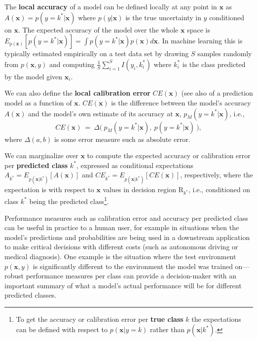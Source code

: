 \documentclass{article}
\newcommand{\ux}{{\mathbf{x}}}
\newcommand{\robby}[1]{\textcolor{Red}{[#1]\textsubscript{Robby}}}
\begin{document}
The {\bf local accuracy} of a model can be defined locally at any point in $\ux$ as $A(\ux) = p(y = k^*| \ux)$ where $p(y | \ux)$ is the true uncertainty in $y$ conditioned on $\ux$.
The expected accuracy of the model over the whole $\ux$ space is $E_{p(\ux)}[p(y = k^*| \ux)] = \int p(y = k^*| \ux) p(\ux) d\ux$.
In machine learning this is typically estimated empirically on a test data set by drawing $S$ samples randomly from $p(\ux,y)$ and computing $\frac{1}{S} \sum_{i=1}^S I(y_i, k_i^*)$ where $k_i^*$ is the class predicted by the model given $\ux_i$.

We can also define the {\bf local calibration error} $CE(\ux)$ (see also \cite{vaicenavicius19a} of a prediction model as a function of $\ux$.
$CE(\ux)$ is the difference between the model's accuracy $A(\ux)$ and the model's own estimate of its accuracy at $\ux$, $p_M(y = k^*| \ux)$, i.e.,
\[
    CE(\ux) \ = \  \Delta\bigl(\ p_M(y = k^*| \ux), \  p(y =k^*| \ux) \  \bigr),
\]
where $\Delta(a,b)$ is some error measure such as absolute error. %

We can marginalize over $\ux$ to compute the expected accuracy or calibration error per {\bf predicted class} $k^*$, expressed as conditional expectations $A_{k^*}  = E_{p(\ux|k^*)}[A(\ux)]$ and $CE_{k^*} = E_{p(\ux|k^*)}[ CE(\ux)]$, respectively, where the expectation is with respect to $\ux$ values in decision region $\mbox{R}_{k^*}$, i.e., conditioned on class $k^* $ being the predicted class\footnote{To get the accuracy or calibration error per {\bf true class} $k$ the expectations can be defined with respect to $p(\ux | y = k)$  rather than $p(\ux|k^*)$.}.

Performance measures such as calibration error and accuracy per predicted class can be useful in practice to a human user, for example in situations  when the model's predictions and probabilities are being used in a downstream application to make critical decisions with different costs (such as autonomous driving or medical diagnosis).
One example is the situation where the test environment $p(\ux,y)$ is significantly different to the environment the model was trained on---robust performance measures per class can provide a decision-maker with an important summary of what a model's actual performance will be for different predicted classes.
\end{document}

